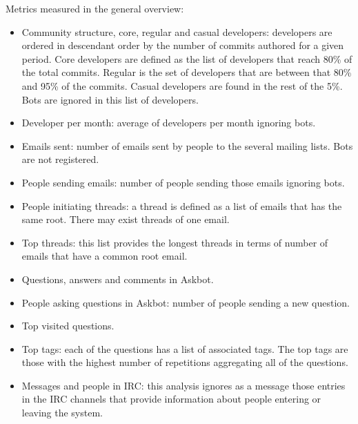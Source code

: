 \documentclass[a4wide,11pt]{report}
\begin{document}
Metrics measured in the general overview:

\begin{itemize}
\item Community structure, core, regular and casual developers: developers are ordered in descendant order by the
number of commits authored for a given period. Core developers are defined as the list of developers that 
reach 80\% of the total commits. Regular is the set of developers that are between that 80\% and 95\% of the commits.
Casual developers are found in the rest of the 5\%. Bots are ignored in this list of developers.

\item Developer per month: average of developers per month ignoring bots.

\item Emails sent: number of emails sent by people to the several mailing lists. Bots are not registered.

\item People sending emails: number of people sending those emails ignoring bots.

\item People initiating threads: a thread is defined as a list of emails that has the same root. There may exist
threads of one email.

\item Top threads: this list provides the longest threads in terms of number of emails that have a common root email.

\item Questions, answers and comments in Askbot.

\item People asking questions in Askbot: number of people sending a new question.

\item Top visited questions.

\item Top tags: each of the questions has a list of associated tags. The top tags  are those 
with the highest number of repetitions aggregating all of the questions.

\item Messages and people in IRC: this analysis ignores as a message those entries in the IRC channels that provide
information about people entering or leaving the system.  

\end{itemize}
\end{document}
